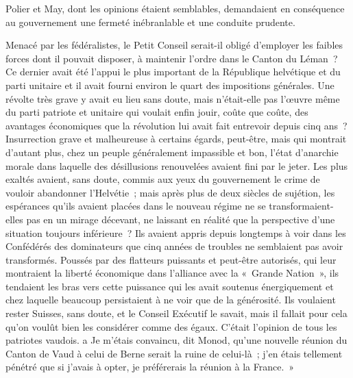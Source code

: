 \documentclass[french,twoside]{book} %
\begin{document}
\noindent Polier et May, dont les opinions étaient semblables, demandaient en conséquence au gouvernement une fermeté inébranlable et une conduite prudente.\par
Menacé par les fédéralistes, le Petit Conseil serait-il obligé d’employer les faibles forces dont il pouvait disposer, à maintenir l’ordre dans le Canton du Léman ? Ce dernier avait été l’appui le plus important de la République helvétique et du parti unitaire et il avait fourni environ le quart des impositions générales. Une révolte très grave y avait eu lieu sans doute, mais n’était-elle pas l’œuvre même du parti patriote et unitaire qui voulait enfin jouir, coûte que coûte, des avantages économiques que la révolution lui avait fait entrevoir depuis cinq ans ? Insurrection grave et malheureuse à certains égards, peut-être, mais qui montrait d’autant plus, chez un peuple généralement impassible et bon, l’état d’anarchie morale dans laquelle des désillusions renouvelées avaient fini par le jeter. Les plus exaltés avaient, sans doute, commis aux yeux du gouvernement le crime de vouloir abandonner l’Helvétie ; mais après plus de deux siècles de sujétion, les espérances qu’ils avaient placées dans le nouveau régime ne se transformaient-elles pas en un mirage décevant, ne laissant en réalité que la perspective d’une situation toujours inférieure ? Ils avaient appris depuis longtemps à voir dans les Confédérés des dominateurs que cinq années de troubles ne semblaient pas avoir transformés. Poussés par des flatteurs puissants et peut-être autorisés, qui leur montraient la liberté économique dans l’alliance avec la « Grande Nation », ils tendaient les bras vers cette puissance qui les avait soutenus énergiquement et chez laquelle beaucoup persistaient à ne voir que de la générosité. Ils voulaient rester Suisses, sans doute, et le Conseil Exécutif le savait, mais il fallait pour cela qu’on voulût bien les considérer comme des égaux. C’était l’opinion de tous les patriotes vaudois. a Je m’étais convaincu, dit Monod, qu’une nouvelle réunion du Canton de Vaud à celui de Berne serait la ruine de celui-là ; j’en étais tellement pénétré que si j’avais à opter, je préférerais la réunion à la France. »\par
\end{document}
